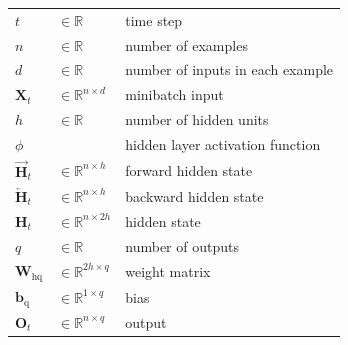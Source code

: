 \begin{customTableWrapper}{1.5}
\begin{longtable}{l l p{6cm}}
    $t$ & $\in \mathbb{R}$ & time step \\

    $n$ & $\in \mathbb{R}$ & number of examples \\

    $d$ & $\in \mathbb{R}$ & number of inputs in each example \\

    $\mathbf{X}_t$ & $\in \mathbb{R}^{n \times d}$ & minibatch input \\

    \hline

    $h$ & $\in \mathbb{R}$ & number of hidden units \\

    $\phi$ & & hidden layer activation function \\

    $\overrightarrow{\mathbf{H}}_t$ & $\in \mathbb{R}^{n \times h}$ & forward hidden state \\

    $\overleftarrow{\mathbf{H}}_t$ & $\in \mathbb{R}^{n \times h}$ & backward hidden state \\

    $\mathbf{H}_t$ & $\in \mathbb{R}^{n \times 2h}$ & hidden state \\

    \hline

    $q$ & $\in \mathbb{R}$ & number of outputs \\

    $\mathbf{W}_{\textrm{hq}}$ & $\in \mathbb{R}^{2h \times q}$ & weight matrix \\

    $\mathbf{b}_\textrm{q}$ & $\in \mathbb{R}^{1 \times q}$ & bias \\
    
    $\mathbf{O}_t$ & $\in \mathbb{R}^{n \times q}$ & output \\

    
\end{longtable}
\end{customTableWrapper}



